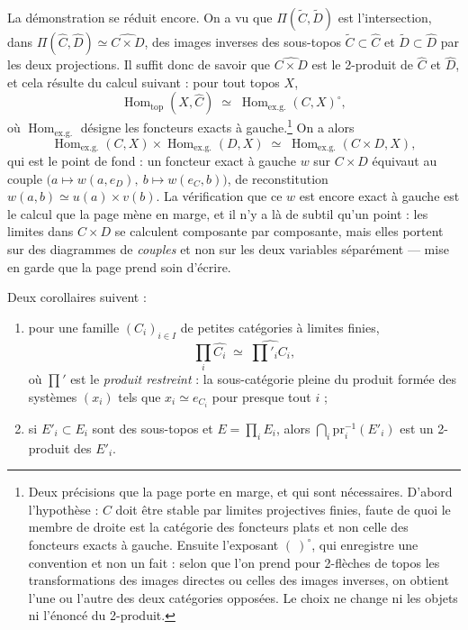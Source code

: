 \documentclass[11pt,a4paper]{article}
\begin{document}
La démonstration se réduit encore. On a vu que
$\Pi(\widetilde{C}, \widetilde{D})$ est l'intersection, dans
$\Pi(\widehat{C}, \widehat{D}) \simeq \widehat{C \times D}$, des images
inverses des sous-topos $\widetilde{C} \subset \widehat{C}$ et
$\widetilde{D} \subset \widehat{D}$ par les deux projections. Il suffit donc de
savoir que $\widehat{C \times D}$ est le 2-produit de $\widehat{C}$ et
$\widehat{D}$, et cela résulte du calcul suivant : pour tout topos $X$,
\[
\operatorname{Hom}_{\mathrm{top}}(X, \widehat{C}) \;\simeq\;
\operatorname{Hom}_{\mathrm{ex.g.}}(C, X)^{\circ},
\]
où $\operatorname{Hom}_{\mathrm{ex.g.}}$ désigne les foncteurs exacts à
gauche.\footnote{Deux précisions que la page porte en marge, et qui sont
nécessaires. D'abord l'hypothèse : $C$ doit être stable par limites projectives
finies, faute de quoi le membre de droite est la catégorie des foncteurs plats
et non celle des foncteurs exacts à gauche. Ensuite l'exposant $(\ )^{\circ}$,
qui enregistre une convention et non un fait : selon que l'on prend pour
2-flèches de topos les transformations des images directes ou celles des images
inverses, on obtient l'une ou l'autre des deux catégories opposées. Le choix ne
change ni les objets ni l'énoncé du 2-produit.} On a alors
\[
\operatorname{Hom}_{\mathrm{ex.g.}}(C, X) \times
\operatorname{Hom}_{\mathrm{ex.g.}}(D, X) \;\simeq\;
\operatorname{Hom}_{\mathrm{ex.g.}}(C \times D, X),
\]
qui est le point de fond : un foncteur exact à gauche $w$ sur $C \times D$
équivaut au couple $\bigl(a \mapsto w(a, e_{D}),\ b \mapsto w(e_{C}, b)\bigr)$,
de reconstitution $w(a,b) \simeq u(a) \times v(b)$. La vérification que ce $w$
est encore exact à gauche est le calcul que la page mène en marge, et il n'y a
là de subtil qu'un point : les limites dans $C \times D$ se calculent
composante par composante, mais elles portent sur des diagrammes de
\emph{couples} et non sur les deux variables séparément — mise en garde que la
page prend soin d'écrire.

Deux corollaires suivent :

\begin{enumerate}
\item[a)] pour une famille $(C_{i})_{i \in I}$ de petites catégories à limites
finies,
\[
\prod_{i} \widehat{C_{i}} \;\simeq\; \widehat{\textstyle\prod'_{i} C_{i}},
\]
où $\prod'$ est le \emph{produit restreint} : la sous-catégorie pleine du
produit formée des systèmes $(x_{i})$ tels que $x_{i} \simeq e_{C_{i}}$ pour
presque tout $i$ ;
\item[b)] si $E'_{i} \subset E_{i}$ sont des sous-topos et $E = \prod_{i} E_{i}$,
alors $\bigcap_{i} \mathrm{pr}_{i}^{-1}(E'_{i})$ est un 2-produit des $E'_{i}$.
\end{enumerate}
\end{document}
